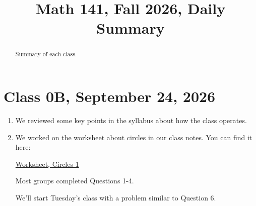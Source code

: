\documentclass{ximera}
\title{Math 141, Fall 2026, Daily Summary}
\begin{document}
\begin{abstract}
Summary of each class.
\end{abstract}
\maketitle

\section{Class 0B, September 24, 2026}

\begin{enumerate}
\item We reviewed some key points in the syllabus about how the class operates.

\item We worked on the worksheet about circles in our class notes. You can find it here:

\href{https://ximera.osu.edu/precalc1/PreCalculus1/WSCircles1/WSCircles1}{Worksheet, Circles 1}

Most groups completed Questions 1-4.  

We'll start Tuesday's class with a problem similar to Question 6.
 
\end{enumerate}
\end{document}
